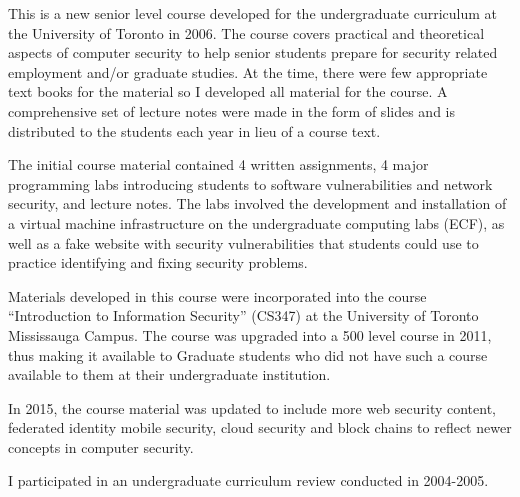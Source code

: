 \begin{rtext}
     This is a new senior level course developed for the undergraduate curriculum at the University of Toronto in 2006.  The course covers practical and theoretical aspects of computer security to help senior students prepare for security related employment and/or graduate studies.  At the time, there were few appropriate text books for the material so I developed all material for the course.  A comprehensive set of lecture notes were made in the form of slides and is distributed to the students each year in lieu of a course text.
    
    The initial course material contained 4 written assignments, 4 major programming labs introducing students to software vulnerabilities and network security, and lecture notes.  The labs involved the development and installation of a virtual machine infrastructure on the undergraduate computing labs (ECF), as well as a fake website with security vulnerabilities that students could use to practice identifying and fixing security problems.  
    
    Materials developed in this course were incorporated into the course ``Introduction to Information Security'' (CS347) at the University of Toronto Mississauga Campus.  The course was upgraded into a 500 level course in 2011, thus making it available to Graduate students who did not have such a course available to them at their
    undergraduate institution.
    
    In 2015, the course material was updated to include more web security content, federated identity mobile security, cloud security and block chains to reflect newer concepts in computer security.  
    
     I participated in an undergraduate curriculum review conducted in 2004-2005.
\end{rtext}